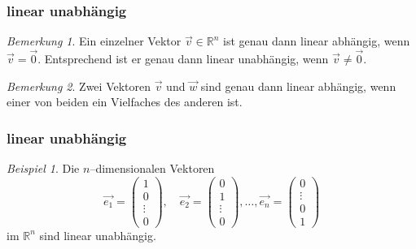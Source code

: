 \documentclass[hyperref={pdfpagelabels=false}]{beamer}
\theoremstyle{plain}%
\theoremstyle{definition}
\theoremstyle{remark}
\newtheorem*{beispiel}{Beispiel}
\newtheorem*{notiz}{Bemerkung}
\def \R{\mathbb R}
\newcommand{\vektor}[1]{\overrightarrow{#1}}
\begin{document}
\begin{frame}
\frametitle{linear unabhängig}

\begin{notiz}
Ein einzelner Vektor $\vektor{v} \in \R^n$ ist genau dann linear abhängig, wenn $\vektor{v} = \vektor{0}$. \pause 
Entsprechend ist er genau dann linear unabhängig, wenn $\vektor{v} \neq \vektor{0}$.
\end{notiz}

\pause 

\begin{notiz} Zwei Vektoren $\vektor{v}$ und $\vektor{w}$ sind genau dann linear abhängig, wenn 
einer von beiden ein Vielfaches des anderen ist.
\end{notiz}


\end{frame}

\begin{frame}
\frametitle{linear unabhängig}

\begin{beispiel} Die $n$--dimensionalen Vektoren  
	$$\vektor{e_1} =  \left( \begin{matrix} 1 \\ 0 \\ \vdots \\ 0 \end{matrix} \right), \quad 
	\vektor{e_2} = \left( \begin{matrix} 0 \\ 1 \\ \vdots \\ 0  \end{matrix} \right), \ldots ,
	 \vektor{e_n} = \left( \begin{matrix} 0 \\ \vdots \\ 0 \\ 1 \end{matrix} \right) $$ 
im $\R^n$ sind linear unabhängig.
\end{beispiel}
\end{frame}
\end{document}
